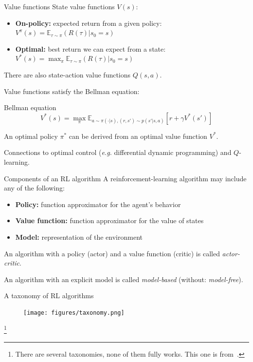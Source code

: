 \documentclass[10pt, aspectratio=1610]{beamer}
\newcommand\blfootnote[1]{%
  \begingroup
  \renewcommand\thefootnote{}%
  \footnote{#1}%
  \addtocounter{footnote}{-1}%
  \endgroup
}
\begin{document}
\begin{frame}{Value functions}
    State value functions $V(s)$:
    \begin{itemize}
        \item \textbf{On-policy:} expected return from a given policy: $V^\pi(s) = \mathbb{E}_{\tau \sim \pi}(R(\tau) | s_0 = s)$
        \item \textbf{Optimal:} best return we can expect from a state: $V^*(s) = \max_\pi \mathbb{E}_{\tau \sim \pi}(R(\tau) | s_0 = s)$
    \end{itemize}
    There are also state-action value functions $Q(s, a)$.

    Value functions satisfy the Bellman equation:
    \begin{block}{Bellman equation}
        \[
            V^*(s) = \max_\pi \mathbb{E}_{a \sim \pi(\cdot | s), (r, s') \sim p(s' | s, a)}[r + \gamma V^*(s')]
        \]
    \end{block}
    An optimal policy $\pi^*$ can be derived from an optimal value function $V^*$.

    Connections to optimal control (\emph{e.g.} differential dynamic programming) and $Q$-learning.
\end{frame}

\begin{frame}{Components of an RL algorithm}
    A reinforcement-learning algorithm may include any of the following:
    \begin{itemize}
        \item \textbf{Policy:} function approximator for the agent's behavior
        \item \textbf{Value function:} function approximator for the value of states
        \item \textbf{Model:} representation of the environment
    \end{itemize}
    An algorithm with a policy (actor) and a value function (critic) is called \emph{actor-critic}.

    An algorithm with an explicit model is called \emph{model-based} (without: \emph{model-free}).
\end{frame}

\begin{frame}{A taxonomy of RL algorithms}
    \begin{figure}
        \texttt{[image: figures/taxonomy.png]}
    \end{figure}
    \blfootnote{
        There are several taxonomies, none of them fully works. This one is from~\cite{spinningup}.
    }
\end{frame}
\end{document}
